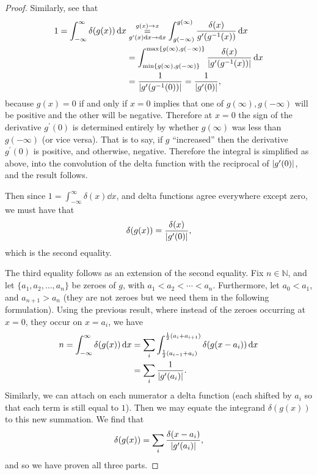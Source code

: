 \documentclass[11pt]{article}
\begin{document}
\begin{enumerate}
\begin{proof}
        Similarly, see that 
        \begin{align*}
            1 = \int_{-\infty}^{\infty} \delta(g(x))\dd{x} &\underset{g^{\prime}(x)\dd{x}\to \dd{x}}{\overset{g(x)\to x}{=}} \int_{g(-\infty)}^{g(\infty)}\frac{\delta(x)}{g^{\prime}(g^{-1}(x))}\dd{x}\\
            &= \int_{\min\{g(\infty),g(-\infty)\}}^{\max\{g(\infty),g(-\infty)\}}\frac{\delta(x)}{\abs{g^\prime(g^{-1}(x))}}\dd{x}\\
            &= \frac{1}{\abs{g^{\prime}(g^{-1}(0))}} = \frac{1}{\abs{g^{\prime}(0)}},
        \end{align*}
        because $g(x) = 0$ if and only if $x=0$ implies that one of $g(\infty), g(-\infty)$ will be positive and the other will be negative. Therefore at $x=0$ the sign of the derivative $g^{\prime}(0)$ is determined entirely by whether $g(\infty)$ was less than $g(-\infty)$ (or vice versa). That is to say, if $g$ ``increased'' then the derivative $g^{\prime}(0)$ is positive, and otherwise, negative. Therefore the integral is simplified as above, into the convolution of the delta function with the reciprocal of $\abs{g^{\prime}(0)}$, and the result follows.

        Then since $1 =\int_{-\infty}^{\infty}\delta(x)\dd{x}$, and delta functions agree everywhere except zero, we must have that \[\delta(g(x)) = \frac{\delta(x)}{\abs{g^{\prime}(0)}},\] which is the second equality.

        The third equality follows as an extension of the second equality. Fix $n\in\mathbb{N}$, and let $\{a_1,a_2,\dots,a_n\}$ be zeroes of $g$, with $a_1 < a_2 < \cdots < a_n$. Furthermore, let $a_0 < a_1$, and $a_{n+1} > a_n$ (they are not zeroes but we need them in the following formulation). Using the previous result, where instead of the zeroes occurring at $x=0$, they occur on $x=a_i$, we have \begin{align*}
            n = \int_{-\infty}^{\infty} \delta(g(x))\dd{x} &= \sum_i \int_{\frac{1}{2}(a_{i-1} + a_i)}^{\frac{1}{2}(a_i + a_{i+1})}\delta(g(x-a_i))\dd{x} \\
            &= \sum_i \frac{1}{\abs{g^{\prime}(a_i)}}.
        \end{align*}
        Similarly, we can attach on each numerator a delta function (each shifted by $a_i$ so that each term is still equal to $1$). Then we may equate the integrand $\delta(g(x))$ to this new summation. We find that \[\delta(g(x)) = \sum_i \frac{\delta(x-a_i)}{\abs{g^{\prime}(a_i)}},\] and so we have proven all three parts.
    \end{proof}
\end{enumerate}
\end{document}
